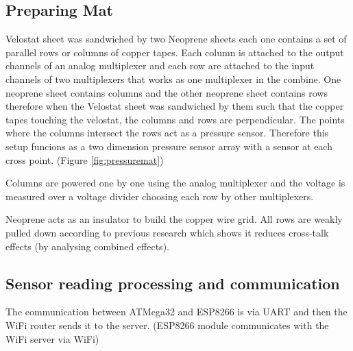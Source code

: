 \subsection{Preparing Mat}

Velostat sheet was sandwiched by two Neoprene sheets each one contains a set of parallel rows or columns of copper tapes. Each column is attached to the output channels of an analog multiplexer and each row are attached to the input channels of two multiplexers that works as one multiplexer in the combine. One neoprene sheet contains columns and the other neoprene sheet contains rows therefore when the Velostat sheet was sandwiched by them such that the copper tapes touching the velostat, the columns and rows are perpendicular. The points where the columns intersect the rows act as a pressure sensor. Therefore this setup funcions as a two dimension pressure sensor array with a sensor at each cross point. (Figure \ref{fig:pressuremat})



Columns are powered one by one using the analog multiplexer and the voltage is measured over a voltage divider choosing each row by other multiplexers. 

Neoprene acts as an insulator to build the copper wire grid. All rows are weakly pulled down according to previous research which shows it reduces cross-talk effects (by analysing combined effects).\cite{saxena}

\subsection{Sensor reading processing and communication}
The communication between ATMega32 and ESP8266 is via UART and then the WiFi router sends it to the server. (ESP8266 module communicates with the WiFi server via WiFi)






